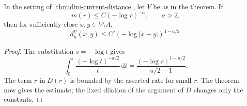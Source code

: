 \begin{corollary}\label{cor:dini-distance-rates}
In the setting of \cref{thm:dini-current-distance}, let $V$ be as in the theorem. If
\[
 m(r)\leq C(-\log r)^{-a},\qquad a>2,
\]
then for sufficiently close $x,y\in V\setminus A$,
\[
 d_\eta^U(x,y)\leq C'(-\log|x-y|)^{1-a/2}.
\]
\end{corollary}
\begin{proof}
The substitution $s=-\log t$ gives
\[
 \int_0^r\frac{(-\log t)^{-a/2}}t\,\mathrm{d}t
 =\frac{(-\log r)^{1-a/2}}{a/2-1}.
\]
The term $r$ in $D(r)$ is bounded by the asserted rate for small $r$. The theorem now gives the estimate; the fixed dilation of the argument of $D$ changes only the constants.
\end{proof}

